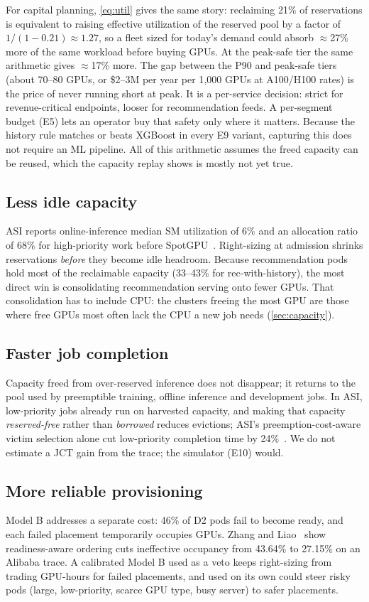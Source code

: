 \noindent For capital planning, \cref{eq:util} gives the same story: reclaiming 21\% of reservations is equivalent to raising effective utilization of the reserved pool by a factor of $1/(1-0.21) \approx 1.27$, so a fleet sized for today's demand could absorb $\approx$27\% more of the same workload before buying GPUs. At the peak-safe tier the same arithmetic gives $\approx$17\% more. The gap between the P90 and peak-safe tiers (about 70--80 GPUs, or \$2--3M per year per 1{,}000 GPUs at A100/H100 rates) is the price of never running short at peak. It is a per-service decision: strict for revenue-critical endpoints, looser for recommendation feeds. A per-segment budget (E5) lets an operator buy that safety only where it matters. Because the history rule matches or beats XGBoost in every E9 variant, capturing this does not require an ML pipeline. All of this arithmetic assumes the freed capacity can be reused, which the capacity replay shows is mostly not yet true.

\subsection{Less idle capacity}
ASI reports online-inference median SM utilization of 6\% and an allocation ratio of 68\% for high-priority work before SpotGPU~\cite{li2026asi}. Right-sizing at admission shrinks reservations \emph{before} they become idle headroom. Because recommendation pods hold most of the reclaimable capacity (33--43\% for rec-with-history), the most direct win is consolidating recommendation serving onto fewer GPUs. That consolidation has to include CPU: the clusters freeing the most GPU are those where free GPUs most often lack the CPU a new job needs (\cref{sec:capacity}).

\subsection{Faster job completion}
Capacity freed from over-reserved inference does not disappear; it returns to the pool used by preemptible training, offline inference and development jobs. In ASI, low-priority jobs already run on harvested capacity, and making that capacity \emph{reserved-free} rather than \emph{borrowed} reduces evictions; ASI's preemption-cost-aware victim selection alone cut low-priority completion time by 24\%~\cite{li2026asi}. We do not estimate a JCT gain from the trace; the simulator (E10) would.

\subsection{More reliable provisioning}
Model B addresses a separate cost: 46\% of D2 pods fail to become ready, and each failed placement temporarily occupies GPUs. Zhang and Liao~\cite{zhang2026ineffective} show readiness-aware ordering cuts ineffective occupancy from 43.64\% to 27.15\% on an Alibaba trace. A calibrated Model B used as a veto keeps right-sizing from trading GPU-hours for failed placements, and used on its own could steer risky pods (large, low-priority, scarce GPU type, busy server) to safer placements.

